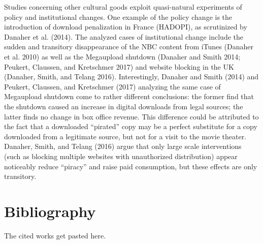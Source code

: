 \documentclass[
  11pt,
]{article}
\begin{document}
Studies concerning other cultural goods exploit quasi-natural
experiments of policy and institutional changes. One example of the
policy change is the introduction of download penalization in France
(HADOPI), as scrutinized by Danaher et al. (2014). The analyzed cases of
institutional change include the sudden and transitory disappearance of
the NBC content from iTunes (Danaher et al. 2010) as well as the
Megaupload shutdown (Danaher and Smith 2014; Peukert, Claussen, and
Kretschmer 2017) and website blocking in the UK (Danaher, Smith, and
Telang 2016). Interestingly, Danaher and Smith (2014) and Peukert,
Claussen, and Kretschmer (2017) analyzing the same case of Megaupload
shutdown come to rather different conclusions: the former find that the
shutdown caused an increase in digital downloads from legal sources; the
latter finds no change in box office revenue. This difference could be
attributed to the fact that a downloaded ``pirated'' copy may be a
perfect substitute for a copy downloaded from a legitimate source, but
not for a visit to the movie theater. Danaher, Smith, and Telang (2016)
argue that only large scale interventions (such as blocking multiple
websites with unauthorized distribution) appear noticeably reduce
``piracy'' and raise paid consumption, but these effects are only
transitory.

\hypertarget{bibliography}{%
\section{Bibliography}\label{bibliography}}

The cited works get pasted here.
\end{document}
